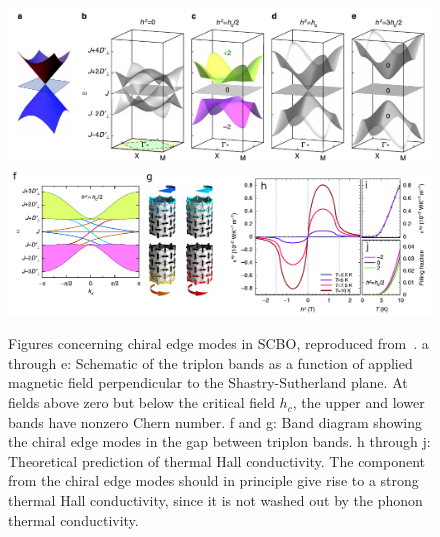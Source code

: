 \documentclass{thesis-umich}
\begin{document}
\begin{figure}
	\centering
	\caption[Chiral Edge Modes in SCBO]{Figures concerning chiral edge modes in SCBO, reproduced from~\cite{Romhanyi2015}. a through e: Schematic of the triplon bands as a function of applied magnetic field perpendicular to the Shastry-Sutherland plane. At fields above zero but below the critical field $h_c$, the upper and lower bands have nonzero Chern number. f and g: Band diagram showing the chiral edge modes in the gap between triplon bands. h through j: Theoretical prediction of thermal Hall conductivity. The component from the chiral edge modes should in principle give rise to a strong thermal Hall conductivity, since it is not washed out by the phonon thermal conductivity.}
	\label{fig:scbo_edge_modes}
	\includegraphics[width=\columnwidth]{figures/SCBO_triplon_bands_Romhanyi.pdf}
	\includegraphics[width=\columnwidth]{figures/SCBO_edge_modes_Romhanyi.pdf}
\end{figure}
\end{document}
